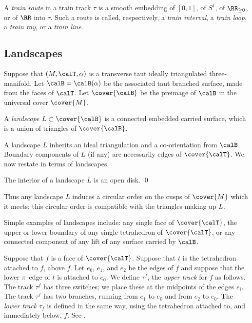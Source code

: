 \documentclass[12pt]{amsart}
\begin{document}
A \emph{train route} in a train track $\tau$ is a smooth embedding of $[0,1]$, of $S^1$, of $\RR_{\geq 0}$, or of $\RR$ into $\tau$.  Such a route is called, respectively, a \emph{train interval}, a \emph{train loop}, a \emph{train ray}, or a \emph{train line}.  


\subsection{Landscapes}

Suppose that $(M, \calT, \alpha)$ is a transverse taut ideally triangulated three-manifold.  
Let $\calB = \calB(\alpha)$ be the associated taut branched surface, made from the faces of $\calT$.   Let $\cover{\calB}$ be the preimage of $\calB$ in the universal cover $\cover{M}$.

\begin{definition}
A \emph{landscape} $L \subset \cover{\calB}$ is a connected embedded carried surface, which is a union of triangles of $\cover{\calB}$.  
\end{definition}

\noindent
A landscape $L$ inherits an ideal triangulation and a co-orientation from $\calB$.  Boundary components of $L$ (if any) are necessarily edges of $\cover{\calT}$.  We now restate \cite[Corollary~1.1]{SchleimerSegerman19} in terms of landscapes.

\begin{lemma}
\label{Lem:Disk}
The interior of a landscape $L$ is an open disk. \qed
\end{lemma}

Thus any landscape $L$ induces a circular order on the cusps of $\cover{M}$ which it meets; this circular order is compatible with the triangles making up $L$. 

Simple examples of landscapes include: any single face of $\cover{\calT}$, the upper or lower boundary of any single tetrahedron of $\cover{\calT}$, or any connected component of any lift of any surface carried by $\calB$.  

\begin{definition}
\label{Def:UpperLowerTrackFace}
Suppose that $f$ is a face of $\cover{\calT}$.  Suppose that $t$ is the tetrahedron attached to $f$, above $f$.  Let $e_0$, $e_1$, and $e_2$ be the edges of $f$ and suppose that the lower $\pi$--edge of $t$ is attached to $e_0$.  We define $\tau^f$, the \emph{upper track} for $f$ as follows.  The track $\tau^f$ has three switches; we place these at the midpoints of the edges $e_i$.  The track $\tau^f$ has two branches, running from $e_1$ to $e_0$ and from $e_2$ to $e_0$.  The \emph{lower track} $\tau_f$ is defined in the same way, using the tetrahedron attached to, and immediately below, $f$.  See . 
\end{definition}
\end{document}
